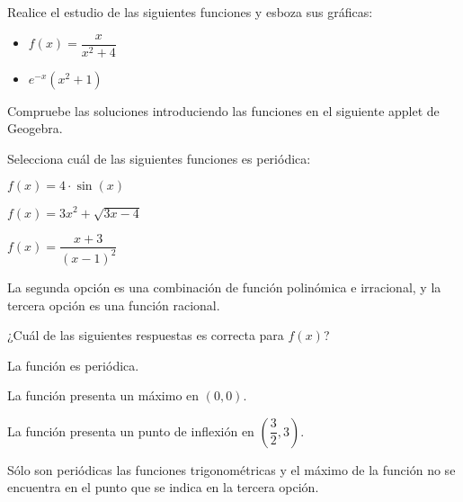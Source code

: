 \vspace{1cm}

\begin{ex}
	Realice el estudio de las siguientes funciones y esboza sus gráficas:
	\begin{itemize}
		\item $f(x) = \dfrac{x}{x^2+4}$
		\item $e^{-x}(x^2+1)$
	\end{itemize}
	\begin{sol}
		Compruebe las soluciones introduciendo las funciones en el siguiente applet de Geogebra.
	\end{sol}
\end{ex}

\vspace{1cm}

\begin{scq}
	Selecciona cuál de las siguientes funciones es periódica:
	
	\begin{choices}
		\begin{choice}[x]
		$f(x)=4 \cdot \sin (x)$
		\end{choice}
		\begin{choice}
		$f(x) = 3x^2 + \sqrt{3x-4}$
		\end{choice}	
		\begin{choice}
		$f(x) = \dfrac{x+3}{(x-1)^2}$
		\end{choice}
	\end{choices}
	\begin{feedback}
		La segunda opción es una combinación de función polinómica e irracional, y la tercera opción es una función racional.
	\end{feedback}
\end{scq}

\vspace{1cm}

\begin{scq}
	¿Cuál de las siguientes respuestas es correcta para $f(x)$?
	\geogebra{jkv5mdur}
	\begin{choices}
		\begin{choice}
		La función es periódica.
		\end{choice}
		\begin{choice}[x]
		La función presenta un máximo en $(0,0)$.
		\end{choice}	
		\begin{choice}
		La función presenta un punto de inflexión en $(\dfrac{3}{2}, 3)$.
		\end{choice}
	\end{choices}
	\begin{feedback}
		Sólo son periódicas las funciones trigonométricas y el máximo de la función no se encuentra en el punto que se indica en la tercera opción.
	\end{feedback}
\end{scq}

